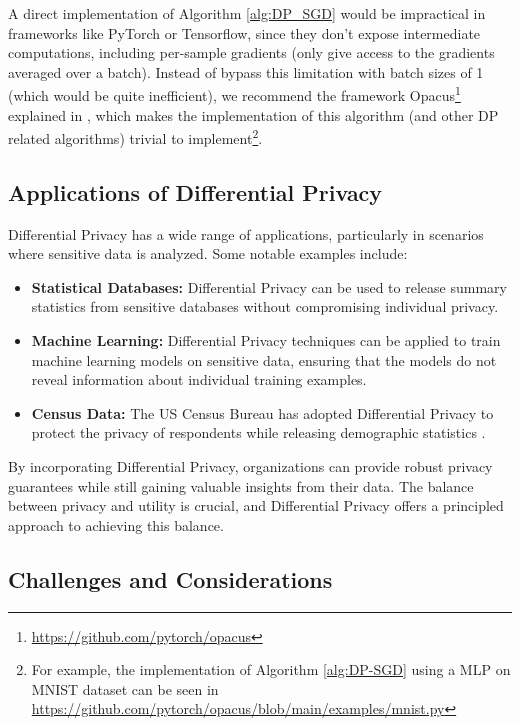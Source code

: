 A direct implementation of Algorithm \ref{alg:DP_SGD} would be impractical in frameworks like PyTorch or Tensorflow, since they don't expose intermediate computations, including per-sample gradients (only give access to the gradients averaged over a batch). Instead of bypass this limitation with batch sizes of 1 (which would be quite inefficient), we recommend the framework Opacus\footnote{\url{https://github.com/pytorch/opacus}} explained in \cite{yousefpour2022}, which makes the implementation of this algorithm (and other DP related algorithms) trivial to implement\footnote{For example, the implementation of Algorithm \ref{alg:DP-SGD} using a MLP on MNIST dataset can be seen in \url{https://github.com/pytorch/opacus/blob/main/examples/mnist.py}}.

\subsection{Applications of Differential Privacy}

Differential Privacy has a wide range of applications, particularly in scenarios where sensitive data is analyzed. Some notable examples include:

\begin{itemize}
    \item \textbf{Statistical Databases:} Differential Privacy can be used to release summary statistics from sensitive databases without compromising individual privacy.
    \item \textbf{Machine Learning:} Differential Privacy techniques can be applied to train machine learning models on sensitive data, ensuring that the models do not reveal information about individual training examples.
    \item \textbf{Census Data:} The US Census Bureau has adopted Differential Privacy to protect the privacy of respondents while releasing demographic statistics \cite{bureau}.
\end{itemize}

By incorporating Differential Privacy, organizations can provide robust privacy guarantees while still gaining valuable insights from their data. The balance between privacy and utility is crucial, and Differential Privacy offers a principled approach to achieving this balance.

\subsection{Challenges and Considerations}

